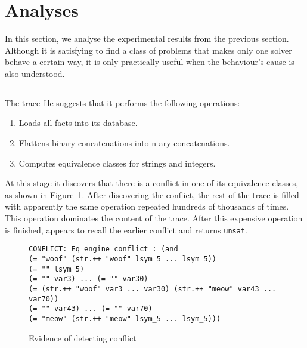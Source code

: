 \section{Analyses}

    In this section, we analyse the experimental results from the previous section. Although it is satisfying to find a class of problems that makes only one solver behave a certain way, it is only practically useful when the behaviour's cause is also understood.


    \subsection{\cHard{}}

        The \cvc{} trace file suggests that it performs the following operations:

        \begin{enumerate}
            \item Loads all facts into its database.
            \item Flattens binary concatenations into n-ary concatenations.
            \item Computes equivalence classes for strings and integers.
        \end{enumerate}

        At this stage it discovers that there is a conflict in one of its equivalence classes, as shown in Figure~\ref{fig:cvc4-conflict}. After discovering the conflict, the rest of the trace is filled with apparently the same operation repeated hundreds of thousands of times. This operation dominates the content of the trace. After this expensive operation is finished, \cvc{} appears to recall the earlier conflict and returns \texttt{unsat}.

        \begin{figure}[h]
            {\scriptsize\begin{verbatim}
CONFLICT: Eq engine conflict : (and
(= "woof" (str.++ "woof" lsym_5 ... lsym_5))
(= "" lsym_5)
(= "" var3) ... (= "" var30)
(= (str.++ "woof" var3 ... var30) (str.++ "meow" var43 ... var70))
(= "" var43) ... (= "" var70)
(= "meow" (str.++ "meow" lsym_5 ... lsym_5)))\end{verbatim}}
            \caption{Evidence of \cvc{} detecting conflict}
            \label{fig:cvc4-conflict}
        \end{figure}

